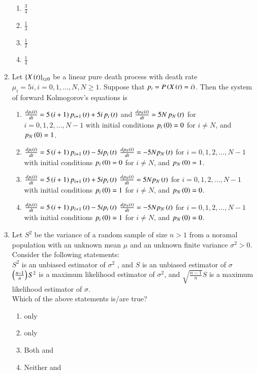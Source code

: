 \documentclass[journal]{IEEEtran}
\begin{document}
\begin{enumerate}
         \begin{enumerate}
               \item $\frac{3}{4}$
               \item $\frac{1}{3}$
               \item $\frac{1}{2}$
               \item $\frac{1}{4}$
         \end{enumerate}
    \item Let $\left\{X\left(t\right)\right\}_{t\geq 0}$ be a linear pure death process  with death rate $\mu_i =5i, i=0,1,\ldots ,N, N\geq 1$. Suppose that $p_i = P\left(X\left(t\right)=i\right)$. Then the system of forward Kolmogorov's equations is 
    \begin{enumerate}
        \item $\frac{dp_i\left(t\right)}{dt} = 5\left(i+1\right)p_{i+1}\left(t\right) + 5i \, p_i\left(t\right)$ 
and $\frac{dp_N\left(t\right)}{dt} = 5N \, p_N\left(t\right)$ for $i = 0, 1, 2, \ldots, N-1$ 
with initial conditions $p_i\left(0\right) = 0$ for $i \neq N$, and $p_N\left(0\right) = 1$.

        \item $\frac{dp_i\left(t\right)}{dt} = 5\left(i+1\right)p_{i+1}\left(t\right) - 5i p_i\left(t\right)$ 
$\frac{dp_N\left(t\right)}{dt} = -5N p_N\left(t\right)$ 
for $i = 0, 1, 2, \ldots, N-1$ with initial conditions $p_i\left(0\right) = 0$ for $i \neq N$, and $p_N\left(0\right) = 1$.

\item $\frac{dp_i\left(t\right)}{dt} = 5\left(i+1\right)p_{i+1}\left(t\right) + 5i p_i\left(t\right)$ 
$\frac{dp_N\left(t\right)}{dt} = 5N p_N\left(t\right)$ 
for $i = 0, 1, 2, \ldots, N-1$ with initial conditions $p_i\left(0\right) = 1$ for $i \neq N$, and $p_N\left(0\right) = 0$.

\item $\frac{dp_i\left(t\right)}{dt} = 5\left(i+1\right)p_{i+1}\left(t\right) - 5i p_i\left(t\right)$ 
$\frac{dp_N\left(t\right)}{dt} = -5N p_N\left(t\right)$ 
for $i = 0, 1, 2, \ldots, N-1$ with initial conditions $p_i\left(0\right) = 1$ for $i \neq N$, and $p_N\left(0\right) = 0$.

    \end{enumerate}
    \item Let $S^2$ be the variance of a random sample of size $n>1$ from a noramal population with an unknown mean $\mu$ and an unknown finite variance $\sigma ^2>0$. Consider the following statements:\\
     $S^2$ is an unbiased estimator of $\sigma ^2$ , and $S$ is an unbiased  estimator of $\sigma$\\
     $\left(\frac{n-1}{n}\right)S^2$ is a maximum likelihood estimator of $\sigma ^2$, and $\sqrt{\frac{n-1}{n}}S$ is a maximum likelihood estimator of $\sigma$.\\
    Which of the above statements is/are true?
    \begin{enumerate}
        \item {} only 
        \item {} only 
        \item Both  and 
        \item Neither  and 
    \end{enumerate}
    
\end{enumerate}	
\end{document}
